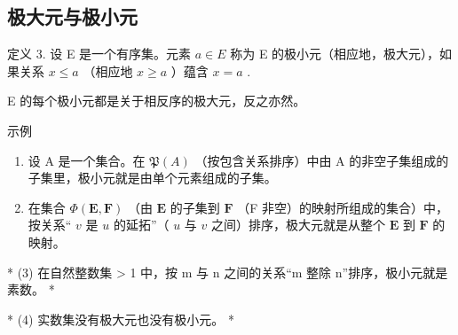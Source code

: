 \subsection{极大元与极小元}

定义 3. 设 E 是一个有序集。元素 \(a \in E\) 称为 E 的极小元（相应地，极大元），如果关系 \(x \leqslant a\) （相应地 \(x \geqslant a\) ）蕴含 \(x = a\) .

E 的每个极小元都是关于相反序的极大元，反之亦然。

示例

\begin{enumerate}
\def\labelenumi{(\arabic{enumi})}
\item
  设 A 是一个集合。在 \(\mathfrak{P}(A)\) （按包含关系排序）中由 A 的非空子集组成的子集里，极小元就是由单个元素组成的子集。
\item
  在集合 \(\Phi(\mathbf{E},\mathbf{F})\) （由 \(\mathbf{E}\) 的子集到 \(\mathbf{F}\) （F 非空）的映射所组成的集合）中，按关系“ \(v\) 是 \(u\) 的延拓”（ \(u\) 与 \(v\) 之间）排序，极大元就是从整个 \(\mathbf{E}\) 到 \(\mathbf{F}\) 的映射。
\end{enumerate}

* (3) 在自然整数集 \textgreater{} 1 中，按 m 与 n 之间的关系“m 整除 n”排序，极小元就是素数。 *

* (4) 实数集没有极大元也没有极小元。 *

